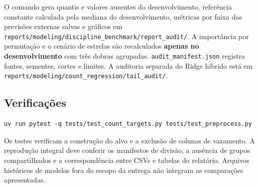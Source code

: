 O comando gera quantis e valores ausentes do desenvolvimento, referência
constante calculada pela mediana do desenvolvimento, métricas por faixa
das previsões externas salvas e gráficos em
\texttt{reports/modeling/discipline\_benchmark/report\_audit/}. A
importância por permutação e o cenário de estrelas são recalculados
\textbf{apenas no desenvolvimento} com três dobras agrupadas.
\texttt{audit\_manifest.json} registra fontes, sementes, cortes e
limites. A auditoria separada do Ridge híbrido está em
\texttt{reports/modeling/count\_regression/tail\_audit/}.

\subsection{Verificações}\label{verificauxe7uxf5es}

\begin{verbatim}
uv run pytest -q tests/test_count_targets.py tests/test_preprocess.py
\end{verbatim}

Os testes verificam a construção do alvo e a exclusão de colunas de
vazamento. A reprodução integral deve conferir os manifestos de divisão,
a ausência de grupos compartilhados e a correspondência entre CSVs e
tabelas do relatório. Arquivos históricos de modelos fora do escopo da
entrega não integram as comparações apresentadas.
